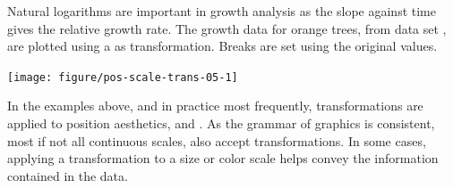 \documentclass[krantz2]{krantz}\usepackage{knitr}
\begin{document}
\begin{knitrout}\footnotesize
{}\color{fgcolor}\begin{kframe}
\begin{alltt}
\hlstd{(}   \hlstd{=} \hlstd{(}    \hlopt{+}
  \hlstd{()} \hlopt{+}
  \hlstd{(} \hlstd{=} \hlstd{)}
\end{alltt}
\end{kframe}
\end{knitrout}

Natural logarithms are important in growth analysis as the slope against time gives the relative growth rate. The growth data for orange trees, from data set , are plotted using a  as transformation. Breaks are set using the original values.



\begin{knitrout}\footnotesize
{}\color{fgcolor}\begin{kframe}
\begin{alltt}
\hlstd{(} 
        \hlstd{=} \hlstd{(}      \hlopt{+}
  \hlstd{()} \hlopt{+}
  \hlstd{()} \hlopt{+}
  \hlstd{(} \hlstd{=} \hlstd{,}  \hlstd{=} \hlstd{(}\hlstd{,} \hlstd{,} \hlstd{,} \hlstd{))}
\end{alltt}
\end{kframe}

{\centering \texttt{[image: figure/pos-scale-trans-05-1]} 

}


\end{knitrout}

\begin{explainbox}
In the examples above, and in practice most frequently, transformations are applied to position aesthetics,  and . As the grammar of graphics is consistent, most if not all continuous scales, also accept transformations. In some cases, applying a transformation to a size or color scale helps convey the information contained in the data.
\end{explainbox}
\end{document}
